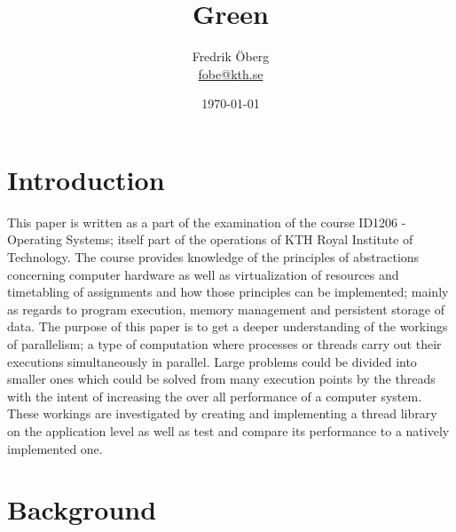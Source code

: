 \documentclass{article}
\begin{document}
\title{Green}
\author{Fredrik Öberg \\ \href{mailto:fobe@kth.se}{fobe@kth.se}}
\date{\today}
\maketitle

\begin{abstract}

\end{abstract}

\newpage
\tableofcontents
\newpage

\section{Introduction}
This paper is written as a part of the examination of the course ID1206 - Operating Systems; itself part of the operations of KTH Royal Institute of Technology. The course provides knowledge of the principles of abstractions concerning computer hardware as well as virtualization of resources and timetabling of assignments and how those principles can be implemented; mainly as regards to program execution, memory management and persistent storage of data. 
The purpose of this paper is to get a deeper understanding of the workings of parallelism; a type of computation where processes or threads carry out their executions simultaneously in parallel. Large problems could be divided into smaller ones which could be solved from many execution points by the threads with the intent of increasing the over all performance of a computer system. These workings are investigated by creating and implementing a thread library on the application level as well as test and compare its performance to a natively implemented one. 

\section{Background}\label{background}
\end{document}
